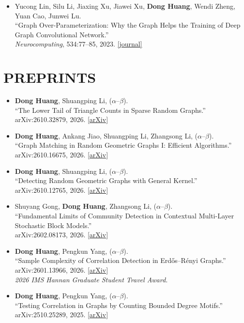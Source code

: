 \documentclass[a4paper,10pt]{extarticle}
\newcommand{\me}{\textbf{Dong Huang}}
\newcommand{\alphaorder}{($\alpha$--$\beta$)}
\newcommand{\arxivlink}[1]{\href{https://arxiv.org/abs/#1}{[arXiv]}}
\newcommand{\papertitle}[1]{\textquotedblleft#1\textquotedblright}
\begin{document}
\begin{itemize}
  \item Yucong Lin, Silu Li, Jiaxing Xu, Jiawei Xu, \me, Wendi Zheng, Yuan Cao, Junwei Lu.\\
  \papertitle{Graph Over-Parameterization: Why the Graph Helps the Training of Deep Graph Convolutional Network.}\\
  \textit{Neurocomputing}, 534:77--85, 2023.
  \href{https://doi.org/10.1016/j.neucom.2023.02.054}{[journal]}
\end{itemize}

\section*{PREPRINTS}
\begin{itemize}
  \item \me, Shuangping Li, \alphaorder.\\
  \papertitle{The Lower Tail of Triangle Counts in Sparse Random Graphs.}\\
  arXiv:2610.32879, 2026. \arxivlink{2610.32879}

  \item \me, Ankang Jiao, Shuangping Li, Zhangsong Li, \alphaorder.\\
  \papertitle{Graph Matching in Random Geometric Graphs I: Efficient Algorithms.}\\
  arXiv:2610.16675, 2026. \arxivlink{2610.16675}

\newpage
  \item \me, Shuangping Li, \alphaorder.\\
  \papertitle{Detecting Random Geometric Graphs with General Kernel.}\\
  arXiv:2610.12765, 2026. \arxivlink{2610.12765}

  \item Shuyang Gong, \me, Zhangsong Li, \alphaorder.\\
  \papertitle{Fundamental Limits of Community Detection in Contextual Multi-Layer Stochastic Block Models.}\\
  arXiv:2602.08173, 2026. \arxivlink{2602.08173}

  \item \me, Pengkun Yang, \alphaorder.\\
  \papertitle{Sample Complexity of Correlation Detection in Erd\H{o}s--R\'enyi Graphs.}\\
  arXiv:2601.13966, 2026. \arxivlink{2601.13966}\\
  \textit{2026 IMS Hannan Graduate Student Travel Award.}

  \item \me, Pengkun Yang, \alphaorder.\\
  \papertitle{Testing Correlation in Graphs by Counting Bounded Degree Motifs.}\\
  arXiv:2510.25289, 2025. \arxivlink{2510.25289}
\end{itemize}
\end{document}

